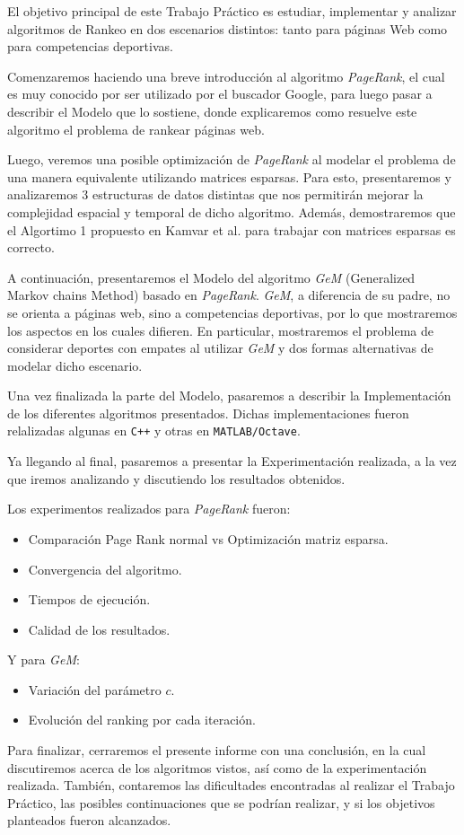 El objetivo principal de este Trabajo Práctico es estudiar, implementar y analizar
 algoritmos de Rankeo en dos escenarios distintos: tanto para páginas Web como para
 competencias deportivas.

Comenzaremos haciendo una breve introducción al algoritmo \textit{PageRank}, el cual
es muy conocido por ser utilizado por el buscador Google,
 para luego pasar a describir el Modelo que lo sostiene,
donde explicaremos como resuelve este algoritmo el problema de rankear
páginas web.

Luego, veremos una posible optimización de \textit{PageRank} al modelar
el problema de una manera equivalente utilizando matrices esparsas. Para esto,
presentaremos y analizaremos 3 estructuras de datos distintas que nos permitirán mejorar la
complejidad espacial y temporal de dicho algoritmo. Además, demostraremos que el Algortimo 1 propuesto en Kamvar et al.\cite{Kamvar2003}
para trabajar con matrices esparsas es correcto.

A continuación, presentaremos el Modelo del algoritmo \textit{GeM} (Generalized Markov chains Method) basado en
\textit{PageRank}. \textit{GeM}, a diferencia de su padre, no se orienta a páginas web, sino a competencias
deportivas, por lo que mostraremos los aspectos en los cuales difieren.
En particular, mostraremos el problema de considerar deportes con empates al utilizar \textit{GeM} y dos formas
alternativas de modelar dicho escenario.

Una vez finalizada la parte del Modelo, pasaremos a describir la Implementación de los
diferentes algoritmos presentados. Dichas implementaciones fueron relalizadas algunas en
\texttt{C++} y otras en \texttt{MATLAB/Octave}.

Ya llegando al final, pasaremos a presentar la Experimentación realizada, a la vez
que iremos analizando y discutiendo los resultados obtenidos.

Los experimentos realizados para \textit{PageRank} fueron:
\begin{itemize}
    \item Comparación Page Rank normal vs Optimización matriz esparsa.
    \item Convergencia del algoritmo.
    \item Tiempos de ejecución.
    \item Calidad de los resultados.
\end{itemize}

Y para \textit{GeM}:
\begin{itemize}
    \item Variación del parámetro $c$.
    \item Evolución del ranking por cada iteración.
\end{itemize}

Para finalizar, cerraremos el presente informe con una conclusión, en la cual
discutiremos acerca de los algoritmos vistos, así como de la experimentación realizada.
También, contaremos las dificultades encontradas al realizar el Trabajo Práctico,
las posibles continuaciones que se podrían realizar, y si los objetivos planteados
fueron alcanzados.

